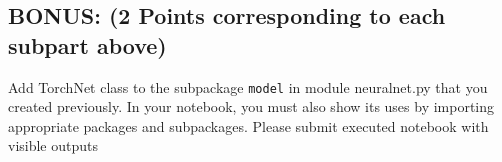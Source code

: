 \documentclass[12pt, xcolor=dvipsnames,svgnames,x11names]{article}
\begin{document}
\subsection{BONUS: (2 Points corresponding to each subpart above)}

Add TorchNet class to the
 subpackage \texttt{model} in module neuralnet.py that you created previously. In your notebook, you must also show its uses by importing appropriate packages and subpackages. Please submit executed notebook with visible outputs
\end{document}
